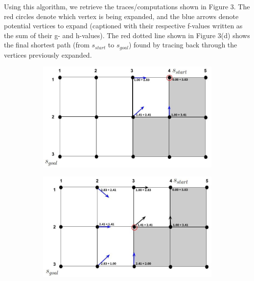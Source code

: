 \documentclass[12pt]{article}
\begin{document}
\begin{enumerate}[label=(\alph*)]
\begin{enumerate}
      Using this algorithm, we retrieve the traces/computations shown in Figure 3. The red circles denote which vertex is being expanded, and the blue arrows denote potential vertices to expand (captioned with their respective f-values written as the sum of their g- and h-values). The red dotted line shown in Figure 3(d) shows the final shortest path (from $s_{start}$ to $s_{goal}$) found by tracing back through the vertices previously expanded.
      \begin{figure}
          \begin{subfigure}{0.5\textwidth}
            \centering
            \includegraphics[width=\textwidth]{homework1/images/drawndiagrams/prob1bi/figure2a.jpg}
            \caption{}
            \label{fig:fig2a}
          \end{subfigure}
          \begin{subfigure}{0.5\textwidth}
            \centering
            \includegraphics[width=\textwidth]{homework1/images/drawndiagrams/prob1bi/figure2b.jpg}
            \caption{}
            \label{fig:fig2b}

\end{subfigure}
\end{figure}
\end{enumerate}
\end{enumerate}
\end{document}
